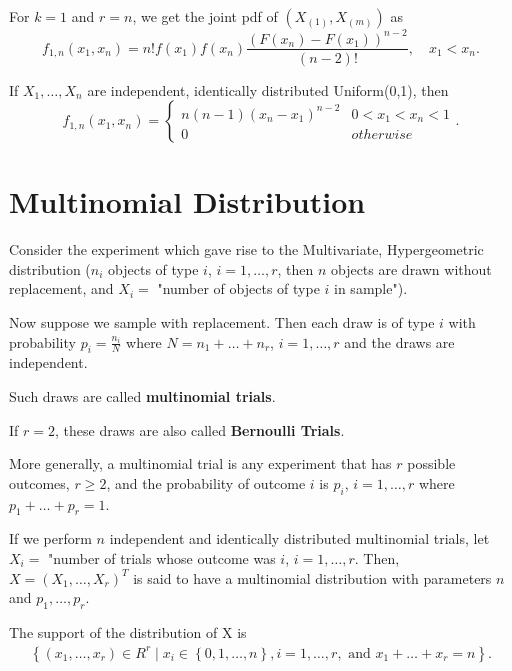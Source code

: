 
For $k = 1$ and $r = n$, we get the joint pdf of $\left( X_{\left( 1 \right) }, X_{\left( m \right) } \right) $ as 
\[
	f _{1, n}\left( x_1, x_{n} \right) = n! f\left( x_1  \right)  f \left( x_{n} \right) \frac{\left( F\left( x_{n} \right)  - F\left( x_1 \right)  \right) ^{n - 2}}{\left( n - 2 \right) !}, \quad x_1 < x_{n}
.\] 
\begin{eg}
	If $X_{1} , \ldots , X_{n}$ are independent, identically distributed Uniform(0,1), then 
	\[
		f_{1, n}\left( x_1, x_{n} \right) = \begin{cases}
			n \left( n -1 \right) \left(  x_{n} - x_1\right)^{n-2} & 0 < x_1 < x_{n} < 1 \\
			0 & otherwise
		\end{cases} 
	.\] 
\end{eg}

\section{Multinomial Distribution}

Consider the experiment which gave rise to the Multivariate, Hypergeometric distribution ($n_{i}$ objects of type $i$,  $i = 1, \ldots, r$, then $n$ objects are drawn without replacement, and $X_{i} = $ "number of objects of type $i$ in sample"). 

Now suppose we sample with replacement. Then each draw is of type  $i$ with probability $p_{i}= \frac{n _{i}}{N}$ where $N = n_1 + \ldots + n_r$, $i = 1, \ldots, r$ and the draws are independent. 

Such draws are called \textbf{multinomial trials}.

If $r = 2$, these draws are also called \textbf{Bernoulli Trials}.

More generally, a multinomial trial is any experiment that has $r$ possible outcomes, $r \ge 2$, and the probability of outcome $i$ is $p_{i}$, $i = 1, \ldots , r$ where $p_1 + \ldots + p_r = 1$.  

If we perform $n$ independent and identically distributed multinomial trials, let $X_{i} = $ "number of trials whose outcome was $i$, $i = 1, \ldots, r$. Then, $X = \left( X_1, \ldots, X_{r} \right) ^{T}$ is said to have a multinomial distribution with parameters $n$ and $p_1, \ldots, p_r$. 

The support of the distribution of X is 
\begin{align*}
	\left\{ \left( x_{1} , \ldots , x_{r} \right) \in  R^{r}  \mid  x_{i} \in \left\{ 0, 1, \ldots, n \right\} , i = 1, \ldots , r , \text{ and } x_{1} + \ldots + x_{r} = n \right\} 
.\end{align*}

